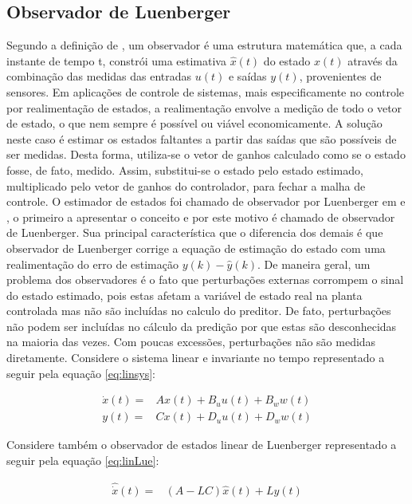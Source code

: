 \subsection{Observador de Luenberger}\label{sc:luemberger}
Segundo a definição de \cite{EllisObserver}, um observador é uma estrutura matemática que, a cada instante de tempo t, constrói uma estimativa $\hat{x}(t)$ do estado $x(t)$ através da combinação das medidas das entradas $u(t)$ e saídas $y(t)$, provenientes de sensores. Em aplicações de controle de sistemas, mais especificamente no controle por realimentação de estados, a realimentação envolve a medição de todo o vetor de estado, o que nem sempre é possível ou viável economicamente. A solução neste caso é estimar os estados faltantes a partir das saídas que são possíveis de ser medidas. Desta forma, utiliza-se o vetor de ganhos calculado como se o estado fosse, de fato, medido. Assim, substitui-se o estado pelo estado estimado, multiplicado pelo vetor de ganhos do controlador, para fechar a malha de controle.
O estimador de estados foi chamado de observador por Luenberger em \cite{Luenberger1971AnObservers} e \cite{Luenberger}, o primeiro a apresentar o conceito e por este motivo é chamado de observador de Luenberger. Sua principal característica que o diferencia dos demais é que observador de Luenberger corrige a equação de estimação do estado com uma realimentação do erro de estimação $y(k)-\hat{y}(k)$.
De maneira geral, um problema dos observadores é o fato que perturbações externas corrompem o sinal do estado estimado, pois estas afetam a variável de estado real na planta controlada mas não são incluídas no calculo do preditor. De fato, perturbações não podem ser incluídas no cálculo da predição por que estas são desconhecidas na maioria das vezes. Com poucas excessões, perturbações não são medidas diretamente.
Considere o sistema linear e invariante no tempo representado a seguir pela equação \ref{eq:linsys}:

\begin{equation}\label{eq:linsys}
    \begin{split}
        \dot{x}(t)=&Ax(t)+B_uu(t)+B_ww(t)\\
              y(t)=&Cx(t)+D_uu(t)+D_ww(t)
    \end{split}
\end{equation}

Considere também o observador de estados linear de Luenberger representado a seguir pela equação \ref{eq:linLue}: 

\begin{equation}\label{eq:linLue}
    \begin{split}
        \hat{\dot{x}}(t)=&(A-LC)\hat{x}(t) + Ly(t) 
    \end{split}
\end{equation}


